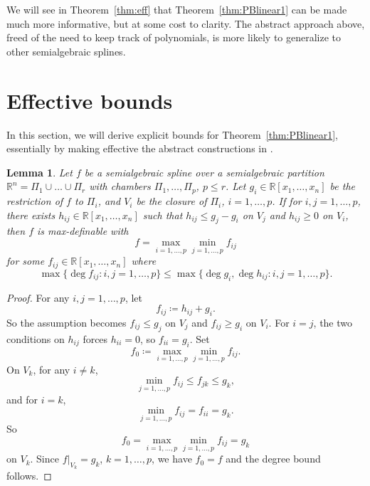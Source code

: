 \documentclass[11pt]{amsart}
\theoremstyle{plain}
\newtheorem{lemma}[theorem]{Lemma}
\theoremstyle{definition}
\begin{document}
We will see in Theorem~\ref{thm:eff} that Theorem~\ref{thm:PBlinear1} can be made much more informative, but at some cost to clarity. The abstract approach above, freed of the need to keep track of polynomials, is more likely to generalize to other semialgebraic splines.

\section{Effective bounds}\label{sec:eff}

In this section, we will derive explicit bounds for Theorem~\ref{thm:PBlinear1}, essentially by making effective the abstract constructions in \cite{Madden1989}.
\begin{lemma}\label{lemma:eff1}
Let $f$ be a semialgebraic spline over  a semialgebraic partition $\mathbb{R}^n = \Pi_1 \cup \dots \cup \Pi_r$ with chambers $\Pi_1,\dots,\Pi_p$,  $p \le r$. Let $g_i \in \mathbb{R}[x_1, \dots, x_n]$ be the restriction of $f$ to $\Pi_i$, and $V_i $ be the closure of $\Pi_i$, $i =1,\dots,p$. If for $ i, j = 1,\dots, p$, there exists $h_{ij} \in \mathbb{R}[x_1, \dots, x_n]$ such that $h_{ij} \le g_j-g_i$ on $V_j$ and $h_{ij} \ge 0 $ on $V_i$, then $f$ is max-definable with
\[
f = \max_{i = 1,\dots,p} \min_{j = 1,\dots,p} f_{ij}
\]
for some $f_{ij} \in \mathbb{R}[x_1, \dots, x_n]$ where
\[
\max \{ \deg f_{ij} : i, j = 1,\dots,p\} \le \max \{\deg g_i, \deg h_{ij} : i, j = 1,\dots, p\}.
\]
\end{lemma}
\begin{proof}
For any $i, j = 1,\dots, p$, let
\[
f_{ij} \coloneqq h_{ij}+g_i.
\]
So the assumption becomes $f_{ij} \le g_j$  on $V_j$ and $f_{ij} \ge g_i $ on $V_i$. For $i = j$, the two conditions on $h_{ij}$ forces $h_{ii} = 0$, so $f_{ii} = g_i$. Set
\[
f_0 \coloneqq \max_{i = 1,\dots,p} \min_{j = 1, \dots, p}f_{ij}.
\]
On $V_k$, for any $i \neq k$,
\[
\min_{j = 1,\dots,p} f_{ij} \le f_{jk} \le g_k,
\]
and for $i = k$,
\[
\min_{j = 1,\dots,p} f_{ij} = f_{ii} = g_k.
\]
So
\[
f_0 = \max_{i = 1,\dots,p} \min_{j = 1,\dots,p} f_{ij} = g_k
\]
on $V_k$. Since $f\rvert_{V_k} = g_k$, $k=1,\dots,p$, we have $f_0 = f$ and the degree bound follows.
\end{proof}
\end{document}
